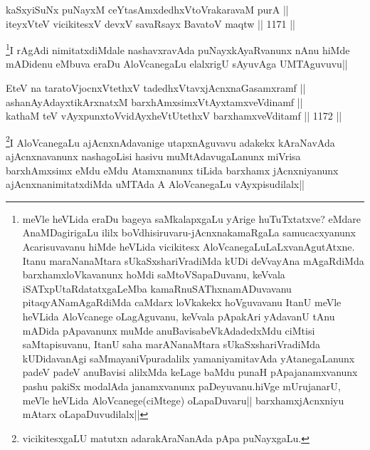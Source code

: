 
\begin{shl}
kaSxyiSuNx puNayxM ceYtasAmxdedhxVtoVrakaravaM purA ||  \\
iteyxVteV vicikitesxV devxV savaRsayx BavatoV maqtw ||  1171 ||  
\end{shl}

\begin{artha}
\footnote{meVle heVLida eraDu bageya saMkalapxgaLu yArige huTuTxtatxve? eMdare AnaMDagirigaLu ililx boVdhisiruvaru-jAcnxnakamaRgaLa samucacxyanunx Acarisuvavanu hiMde heVLida vicikitesx AloVcanegaLuLaLxvanAgutAtxne. Itanu maraNanaMtara sUkaSxshariVradiMda kUDi deVvayAna mAgaRdiMda barxhamxloVkavanunx hoMdi saMtoVSapaDuvanu, keVvala iSATxpUtaRdatatxgaLeMba kamaRnuSAThxnamADuvavanu pitaqyANamAgaRdiMda caMdarx loVkakekx hoVguvavanu ItanU meVle heVLida AloVcanege oLagAguvanu, keVvala pApakAri yAdavanU tAnu mADida pApavanunx muMde anuBavisabeVkAdadedxMdu ciMtisi saMtapisuvanu, ItanU saha marANanaMtara sUkaSxshariVradiMda kUDidavanAgi saMmayaniVpuradalilx yamaniyamitavAda yAtanegaLanunx padeV padeV anuBavisi alilxMda keLage baMdu punaH pApajanamxvanunx pashu pakiSx modalAda janamxvanunx paDeyuvanu.hiVge mUrujanarU, meVle heVLida AloVcanege(ciMtege) oLapaDuvaru|| barxhamxjAcnxniyu mAtarx oLapaDuvudilalx||}I rAgAdi nimitatxdiMdale nashavxravAda puNayxkAyaRvanunx nAnu hiMde mADidenu eMbuva eraDu AloVcanegaLu elalxrigU sAyuvAga UMTAguvuvu||
\end{artha}

\begin{shl}
EteV na taratoV\s jocnxVtethxV tadedhxVtavxjAcnxnaGasamxramf || \\
ashanAyAdayxtikArxnatxM barxhAmxsimxVtAyxtamxveVdinamf || \\
kathaM teV vAyxpunxtoV\s vidAyxheVtUtethxV barxhamxveVditamf ||  1172 ||  
\end{shl}

\begin{artha}
\footnote{vicikitesxgaLU matutxn adarakAraNanAda pApa puNayxgaLu.}I AloVcanegaLu ajAcnxnAdavanige utapxnAguvavu adakekx kAraNavAda ajAcnxnavanunx nashagoLisi hasivu muMtAdavugaLanunx miVrisa barxhAmxsimx eMdu eMdu Atamxnanunx tiLida barxhamx jAcnxniyanunx ajAcnxnanimitatxdiMda uMTAda A AloVcanegaLu vAyxpisudilalx||
\end{artha}


